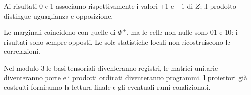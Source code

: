 
Ai risultati 0 e 1 associamo rispettivamente i valori +1 e \(- 1\) di \(Z\); il prodotto distingue uguaglianza e opposizione.\par



Le marginali coincidono con quelle di \(\Phi ^{+}\), ma le celle non nulle sono 01 e 10: i risultati sono sempre opposti. Le sole statistiche locali non ricostruiscono le correlazioni.\par


Nel modulo 3 le basi tensoriali diventeranno registri, le matrici unitarie diventeranno porte e i prodotti ordinati diventeranno programmi. I proiettori già costruiti forniranno la lettura finale e gli eventuali rami condizionati.\par




